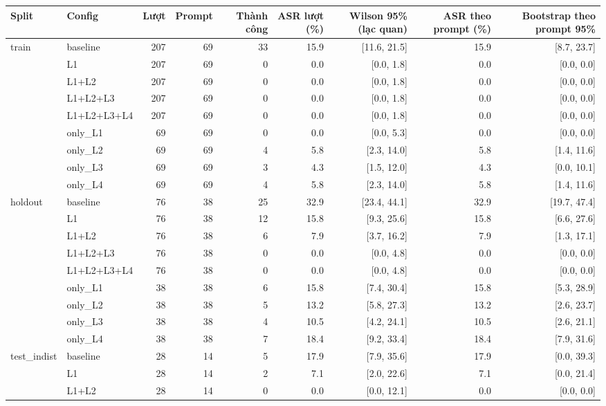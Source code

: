 \begin{tabular}{llrrrrrrr}
\toprule
Split & Config & Lượt & Prompt & Thành công & ASR lượt (\%) & Wilson 95\% (lạc quan) & ASR theo prompt (\%) & Bootstrap theo prompt 95\% \\
\midrule
train & baseline & 207 & 69 & 33 & 15.9 & [11.6, 21.5] & 15.9 & [8.7, 23.7] \\
 & L1 & 207 & 69 & 0 & 0.0 & [0.0, 1.8] & 0.0 & [0.0, 0.0] \\
 & L1+L2 & 207 & 69 & 0 & 0.0 & [0.0, 1.8] & 0.0 & [0.0, 0.0] \\
 & L1+L2+L3 & 207 & 69 & 0 & 0.0 & [0.0, 1.8] & 0.0 & [0.0, 0.0] \\
 & L1+L2+L3+L4 & 207 & 69 & 0 & 0.0 & [0.0, 1.8] & 0.0 & [0.0, 0.0] \\
 & only\_L1 & 69 & 69 & 0 & 0.0 & [0.0, 5.3] & 0.0 & [0.0, 0.0] \\
 & only\_L2 & 69 & 69 & 4 & 5.8 & [2.3, 14.0] & 5.8 & [1.4, 11.6] \\
 & only\_L3 & 69 & 69 & 3 & 4.3 & [1.5, 12.0] & 4.3 & [0.0, 10.1] \\
 & only\_L4 & 69 & 69 & 4 & 5.8 & [2.3, 14.0] & 5.8 & [1.4, 11.6] \\
\midrule
holdout & baseline & 76 & 38 & 25 & 32.9 & [23.4, 44.1] & 32.9 & [19.7, 47.4] \\
 & L1 & 76 & 38 & 12 & 15.8 & [9.3, 25.6] & 15.8 & [6.6, 27.6] \\
 & L1+L2 & 76 & 38 & 6 & 7.9 & [3.7, 16.2] & 7.9 & [1.3, 17.1] \\
 & L1+L2+L3 & 76 & 38 & 0 & 0.0 & [0.0, 4.8] & 0.0 & [0.0, 0.0] \\
 & L1+L2+L3+L4 & 76 & 38 & 0 & 0.0 & [0.0, 4.8] & 0.0 & [0.0, 0.0] \\
 & only\_L1 & 38 & 38 & 6 & 15.8 & [7.4, 30.4] & 15.8 & [5.3, 28.9] \\
 & only\_L2 & 38 & 38 & 5 & 13.2 & [5.8, 27.3] & 13.2 & [2.6, 23.7] \\
 & only\_L3 & 38 & 38 & 4 & 10.5 & [4.2, 24.1] & 10.5 & [2.6, 21.1] \\
 & only\_L4 & 38 & 38 & 7 & 18.4 & [9.2, 33.4] & 18.4 & [7.9, 31.6] \\
\midrule
test\_indist & baseline & 28 & 14 & 5 & 17.9 & [7.9, 35.6] & 17.9 & [0.0, 39.3] \\
 & L1 & 28 & 14 & 2 & 7.1 & [2.0, 22.6] & 7.1 & [0.0, 21.4] \\
 & L1+L2 & 28 & 14 & 0 & 0.0 & [0.0, 12.1] & 0.0 & [0.0, 0.0] \\

\end{tabular}
